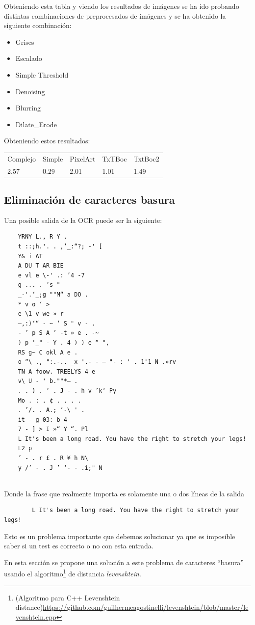 Obteniendo esta tabla y viendo los resultados de imágenes se ha ido probando distintas combinaciones de preprocesados de imágenes y se ha obtenido la siguiente combinación:
\begin{itemize}
	\item Grises
	\item Escalado
	\item Simple Threshold
	\item Denoising
	\item Blurring
	\item Dilate\_Erode	
\end{itemize}
Obteniendo estos resultados:
\begin{table}[H]
	\begin{tabular}{lllll}
		Complejo & Simple & PixelArt & TxTBoc & TxtBoc2                      \\
		2.57     & 0.29   & 2.01     & 1.01   & 1.49
	\end{tabular}
\end{table}
\subsection{Eliminación de caracteres basura}
Una posible salida de la OCR puede ser la siguiente:

\begin{verbatim}
	YRNY L., R Y .
	t ::;h.'. . ,’_:“?; -' [
	Y& i AT
	A DU T AR BIE
	e vl e \-' .: ’4 -7
	g ... . ‘s "
	_-'.‘_;g ""M“ a DO .
	* v o ‘ >
	e \1 v we » r
	—,:)‘“ - ~ ‘ S " v - .
	- ’ p S A ’ -t » e . -~
	) p '_" - Y . 4 ) ) e “ ",
	RS g~ C okl A e .
	o “\ ., ":.-.. _x '.- - — "- : ' . 1'1 N .»rv
	TN A foow. TREELYS 4 e
	v\ U - ' b.""*— .
	. . ) . ‘ . J - . h v ’k‘ Py
	Mo . : . ¢ . . . .
	. ’/. . A.; ‘-\ ' .
	it - g 03: b 4
	7 - ] > I »“ Y “. Pl
	L It's been a long road. You have the right to stretch your legs!
	L2 p
	’ - . r £ . R ¥ h N\
	y /’ - . J ’ ‘- - .i;" N
	
\end{verbatim}
Donde la frase que realmente importa es solamente una o dos líneas de la salida
\begin{verbatim}
		L It's been a long road. You have the right to stretch your legs!
\end{verbatim}
Esto es un problema importante que debemos solucionar ya que es imposible saber si un test es correcto o no con esta entrada.

En esta sección se propone una solución a este problema de caracteres ``basura'' usando el algoritmo\footnote{(Algoritmo para C++ Levenshtein distance)\url{https://github.com/guilhermeagostinelli/levenshtein/blob/master/levenshtein.cpp}} de distancia \emph{levenshtein}.


